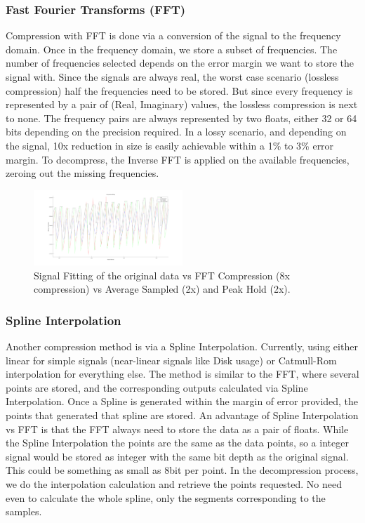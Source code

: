 \documentclass[conference]{IEEEtran}
\begin{document}
\vspace{10pt}
\subsubsection{Fast Fourier Transforms (FFT)}

Compression with FFT is done via a conversion of the signal to the frequency domain. Once in the frequency domain, we store a subset of frequencies.
The number of frequencies selected depends on the error margin we want to store the signal with. Since the signals are always real, the worst case scenario (lossless compression) half the frequencies need to be stored.
But since every frequency is represented by a pair of (Real, Imaginary) values, the lossless compression is next to none. 
The frequency pairs are always represented by two floats, either 32 or 64 bits depending on the precision required.
In a lossy scenario, and depending on the signal, 10x reduction in size is easily achievable within a 1\% to 3\% error margin.
To decompress, the Inverse FFT is applied on the available frequencies, zeroing out the missing frequencies.

\begin{figure}[ht]
  \centering
  \includegraphics[width=0.5\textwidth]{FFT_Comparison.png}
  \caption{Signal Fitting of the original data vs FFT Compression (8x compression) vs Average Sampled (2x) and Peak Hold (2x).}
  \label{fft_comparison}
\end{figure}
\vspace{5pt}

\subsubsection{Spline Interpolation}

Another compression method is via a Spline Interpolation. Currently, using either linear for simple signals (near-linear signals like Disk usage) or Catmull-Rom interpolation for everything else.
The method is similar to the FFT, where several points are stored, and the corresponding outputs calculated via Spline Interpolation.
Once a Spline is generated within the margin of error provided, the points that generated that spline are stored.
An advantage of Spline Interpolation vs FFT is that the FFT always need to store the data as a pair of floats. 
While the Spline Interpolation the points are the same as the data points, so a integer signal would be stored as integer with the same bit depth as the original signal.
This could be something as small as 8bit per point.
In the decompression process, we do the interpolation calculation and retrieve the points requested.
No need even to calculate the whole spline, only the segments corresponding to the samples.
\end{document}
